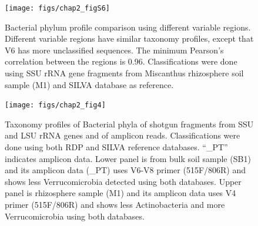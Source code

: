 \documentclass[]{msu-thesis}
\begin{document}
\begin{figure}[tbph!]
  \centering
  \texttt{[image: figs/chap2\_figS6]}
  \caption[Bacterial phylum profile comparison using different variable regions]{Bacterial phylum profile comparison using different variable regions. Different variable regions have similar taxonomy profiles, except that V6 has more unclassified sequences. The minimum Pearson’s correlation between the regions is 0.96. Classifications were done using SSU rRNA gene fragments from Miscanthus rhizosphere soil sample (M1) and SILVA database as reference.}
  \label{fig:chap2FigS6}
\end{figure}


\begin{figure}[tbph!]
  \centering
  \texttt{[image: figs/chap2\_fig4]}
  \caption[Phylum profiles of shotgun fragments from SSU and LSU rRNA genes and of amplicon reads]{Taxonomy profiles of Bacterial phyla of shotgun fragments from SSU and LSU rRNA genes and of amplicon reads. Classifications were done using both RDP and SILVA reference databases. ``\_PT'' indicates amplicon data. Lower panel is from bulk soil sample (SB1) and its amplicon data (\_PT) uses V6-V8 primer (515F/806R) and shows less Verrucomicrobia detected using both databases. Upper panel is rhizosphere sample (M1) and its amplicon data uses V4 primer (515F/806R) and shows less Actinobacteria and more Verrucomicrobia using both databases.}
  \label{fig:chap2Fig4}
\end{figure}
\end{document}
